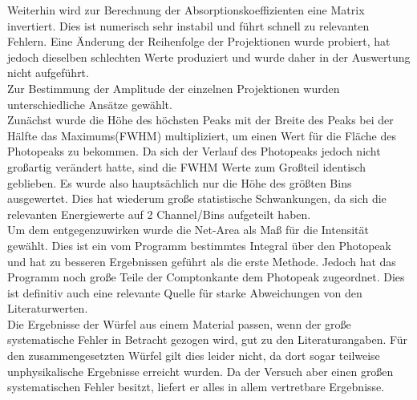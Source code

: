 Weiterhin wird zur Berechnung der Absorptionskoeffizienten eine Matrix invertiert. 
Dies ist numerisch sehr instabil und führt schnell zu relevanten Fehlern.
Eine Änderung der Reihenfolge der Projektionen wurde probiert, hat jedoch dieselben schlechten Werte produziert und wurde daher in der Auswertung nicht aufgeführt.\\
Zur Bestimmung der Amplitude der einzelnen Projektionen wurden unterschiedliche Ansätze gewählt.\\
Zunächst wurde die Höhe des höchsten Peaks mit der Breite des Peaks bei der Hälfte das Maximums(FWHM) multipliziert, um einen Wert für die Fläche des Photopeaks zu bekommen.
Da sich der Verlauf des Photopeaks jedoch nicht großartig verändert hatte, sind die FWHM Werte zum Großteil identisch geblieben. 
Es wurde also hauptsächlich nur die Höhe des größten Bins ausgewertet. Dies hat wiederum große statistische Schwankungen, da sich die relevanten Energiewerte auf 2 Channel/Bins aufgeteilt haben.\\
Um dem entgegenzuwirken wurde die Net-Area als Maß für die Intensität gewählt. Dies ist ein vom Programm bestimmtes Integral über den Photopeak und hat zu besseren Ergebnissen geführt als die erste Methode.
Jedoch hat das Programm noch große Teile der Comptonkante dem Photopeak zugeordnet. 
Dies ist definitiv auch eine relevante Quelle für starke Abweichungen von den Literaturwerten.\\
Die Ergebnisse der Würfel aus einem Material passen, wenn der große systematische Fehler in Betracht gezogen wird, gut zu den Literaturangaben.
Für den zusammengesetzten Würfel gilt dies leider nicht, da dort sogar teilweise unphysikalische Ergebnisse erreicht wurden.
Da der Versuch aber einen großen systematischen Fehler besitzt, liefert er alles in allem vertretbare Ergebnisse.